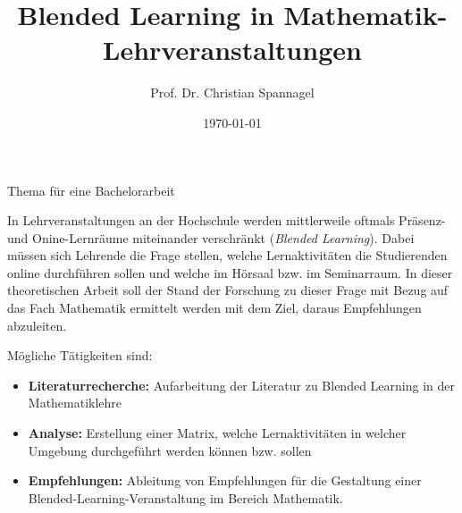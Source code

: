 \documentclass{../../cssheet}
\title{Blended Learning in Mathematik-Lehrveranstaltungen}
\author{Prof. Dr. Christian Spannagel}
\date{\today}
\begin{document}
\vspace*{5mm}
\begin{center}
{\Large Thema für eine Bachelorarbeit}
\end{center}

\printtitle
\vspace*{1cm}

In Lehrveranstaltungen an der Hochschule werden mittlerweile oftmals Präsenz- und Onine-Lernräume miteinander verschränkt (\emph{Blended Learning}). Dabei müssen sich Lehrende die Frage stellen, welche Lernaktivitäten die Studierenden online durchführen sollen und welche im Hörsaal bzw. im Seminarraum. In dieser theoretischen Arbeit soll der Stand der Forschung zu dieser Frage mit Bezug auf das Fach Mathematik ermittelt werden mit dem Ziel, daraus Empfehlungen abzuleiten.

Mögliche Tätigkeiten sind:
\begin{itemize}
\item \textbf{Literaturrecherche:} Aufarbeitung der Literatur zu Blended Learning in der Mathematiklehre
\item \textbf{Analyse:} Erstellung einer Matrix, welche Lernaktivitäten in welcher Umgebung durchgeführt werden können bzw. sollen
\item \textbf{Empfehlungen:} Ableitung von Empfehlungen für die Gestaltung einer Blended-Learning-Veranstaltung im Bereich Mathematik.
\end{itemize}

\vspace*{10mm}

\printlicense

\printsocials
\end{document}

